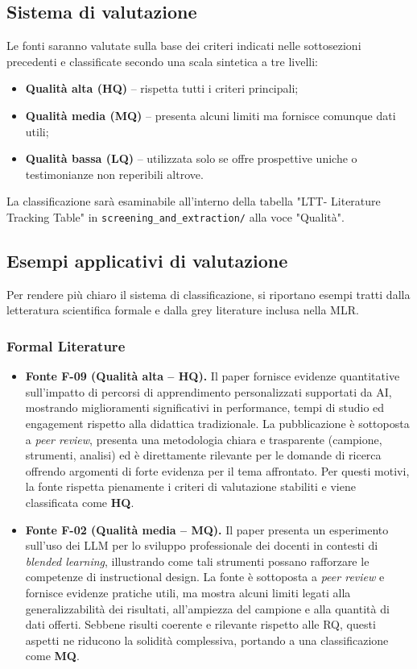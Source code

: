 \documentclass[a4paper,9pt]{article}
\begin{document}
\subsection{Sistema di valutazione}

Le fonti saranno valutate sulla base dei criteri indicati nelle sottosezioni precedenti e classificate secondo una scala sintetica a tre livelli:
\begin{itemize}
	\item \textbf{Qualità alta (HQ)} – rispetta tutti i criteri principali;
	\item \textbf{Qualità media (MQ)} – presenta alcuni limiti ma fornisce comunque dati utili;
	\item \textbf{Qualità bassa (LQ)} – utilizzata solo se offre prospettive uniche o testimonianze non reperibili altrove.
\end{itemize}
La classificazione sarà esaminabile all'interno della tabella "LTT- Literature Tracking Table" in \texttt{screening\_and\_extraction/} alla voce "Qualità".

\subsection{Esempi applicativi di valutazione}

Per rendere più chiaro il sistema di classificazione, si riportano esempi tratti dalla letteratura scientifica formale e dalla grey literature inclusa nella MLR.

\subsubsection{Formal Literature}
\begin{itemize}
	\item \textbf{Fonte F-09 (Qualità alta – HQ).}  
	Il paper fornisce evidenze quantitative sull’impatto di percorsi di apprendimento personalizzati supportati da AI, mostrando miglioramenti significativi in performance, tempi di studio ed engagement rispetto alla didattica tradizionale. La pubblicazione è sottoposta a \emph{peer review}, presenta una metodologia chiara e trasparente (campione, strumenti, analisi) ed è direttamente rilevante per le domande di ricerca offrendo argomenti di forte evidenza per il tema affrontato. Per questi motivi, la fonte rispetta pienamente i criteri di valutazione stabiliti e viene classificata come \textbf{HQ}.
	
	\item \textbf{Fonte F-02 (Qualità media – MQ).}  
	Il paper presenta un esperimento sull’uso dei LLM per lo sviluppo professionale dei docenti in contesti di \emph{blended learning}, illustrando come tali strumenti possano rafforzare le competenze di instructional design. La fonte è sottoposta a \emph{peer review} e fornisce evidenze pratiche utili, ma mostra alcuni limiti legati alla generalizzabilità dei risultati, all’ampiezza del campione e alla quantità di dati offerti. Sebbene risulti coerente e rilevante rispetto alle RQ, questi aspetti ne riducono la solidità complessiva, portando a una classificazione come \textbf{MQ}.
	
\end{itemize}
\end{document}
